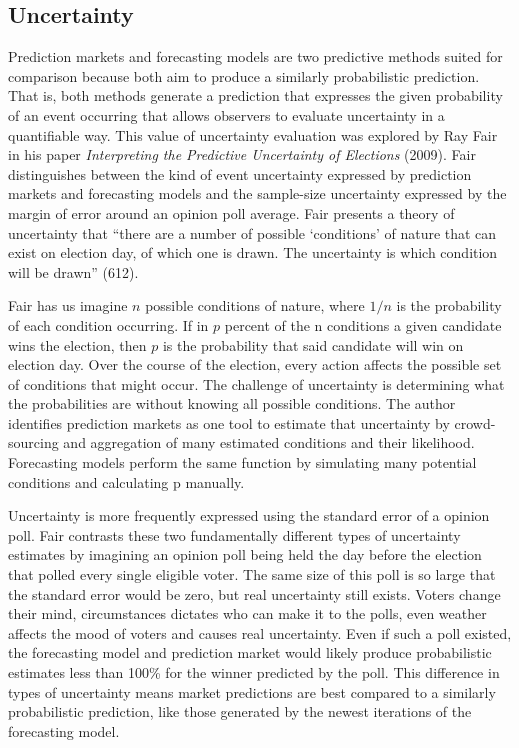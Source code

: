 \documentclass[11pt,]{article}
\begin{document}
\hypertarget{uncertainty}{%
\subsection{Uncertainty}\label{uncertainty}}

Prediction markets and forecasting models are two predictive methods
suited for comparison because both aim to produce a similarly
probabilistic prediction. That is, both methods generate a prediction
that expresses the given probability of an event occurring that allows
observers to evaluate uncertainty in a quantifiable way. This value of
uncertainty evaluation was explored by Ray Fair in his paper
\emph{Interpreting the Predictive Uncertainty of Elections} (2009). Fair
distinguishes between the kind of event uncertainty expressed by
prediction markets and forecasting models and the sample-size
uncertainty expressed by the margin of error around an opinion poll
average. Fair presents a theory of uncertainty that ``there are a number
of possible `conditions' of nature that can exist on election day, of
which one is drawn. The uncertainty is which condition will be drawn''
(612).

Fair has us imagine \(n\) possible conditions of nature, where \(1/n\)
is the probability of each condition occurring. If in \(p\) percent of
the n conditions a given candidate wins the election, then \(p\) is the
probability that said candidate will win on election day. Over the
course of the election, every action affects the possible set of
conditions that might occur. The challenge of uncertainty is determining
what the probabilities are without knowing all possible conditions. The
author identifies prediction markets as one tool to estimate that
uncertainty by crowd-sourcing and aggregation of many estimated
conditions and their likelihood. Forecasting models perform the same
function by simulating many potential conditions and calculating p
manually.

Uncertainty is more frequently expressed using the standard error of a
opinion poll. Fair contrasts these two fundamentally different types of
uncertainty estimates by imagining an opinion poll being held the day
before the election that polled every single eligible voter. The same
size of this poll is so large that the standard error would be zero, but
real uncertainty still exists. Voters change their mind, circumstances
dictates who can make it to the polls, even weather affects the mood of
voters and causes real uncertainty. Even if such a poll existed, the
forecasting model and prediction market would likely produce
probabilistic estimates less than 100\% for the winner predicted by the
poll. This difference in types of uncertainty means market predictions
are best compared to a similarly probabilistic prediction, like those
generated by the newest iterations of the forecasting model.
\end{document}
